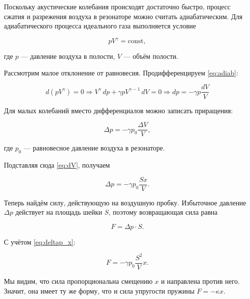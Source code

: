 \documentclass[12pt]{extreport}
\begin{document}
	Поскольку акустические колебания происходят достаточно быстро, процесс сжатия и разрежения воздуха в резонаторе можно считать адиабатическим. Для адиабатического процесса идеального газа выполняется условие
	
	
	\begin{equation}
		pV^\gamma=\mathrm{const},
		\label{eq:adiab}
	\end{equation}
	
	
	где \(p\) --- давление воздуха в полости, \(V\) --- объём полости.
	
	Рассмотрим малое отклонение от равновесия. Продифференцируем \eqref{eq:adiab}:

	
	\begin{equation}
		d(pV^\gamma)=0 \Rightarrow V^\gamma\,dp+\gamma pV^{\gamma-1}\,dV=0 \Rightarrow  dp=-\gamma p\frac{dV}{V}
		\label{eq:dp}
	\end{equation}
	
	
	Для малых колебаний вместо дифференциалов можно записать приращения:
	
	
	\begin{equation}
		\Delta p=-\gamma p_0\frac{\Delta V}{V},
		\label{eq:deltap}
	\end{equation}
	
	
	где \(p_0\) --- равновесное давление воздуха в резонаторе.
	
	Подставляя сюда \eqref{eq:dV}, получаем
	
	
	\begin{equation}
		\Delta p=-\gamma p_0\frac{Sx}{V}.
		\label{eq:deltap_x}
	\end{equation}
	
	
	Теперь найдём силу, действующую на воздушную пробку. Избыточное давление \(\Delta p\) действует на площадь шейки \(S\), поэтому возвращающая сила равна
	
	
	\begin{equation}
		F=\Delta p \cdot S.
	\end{equation}
	
	
	С учётом \eqref{eq:deltap_x}:
	
	
	\begin{equation}
		F=-\gamma p_0\frac{S^2}{V}x.
		\label{eq:Fspring}
	\end{equation}
	
	
	Мы видим, что сила пропорциональна смещению \(x\) и направлена против него. Значит, она имеет ту же форму, что и сила упругости пружины $F=-\kappa x$.

	
	
\end{document}
